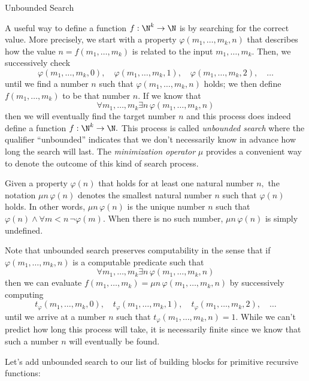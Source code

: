 \begin{unit}{Unbounded Search}

A useful way to define a function \(f:\N^k\to\N\) is by searching for the correct value.
More precisely, we start with a property \(\varphi(m_1,\dots,m_k,n)\) that describes how the value \(n = f(m_1,\dots,m_k)\) is related to the input \(m_1,\dots,m_k.\)
Then, we successively check \[\varphi(m_1,\dots,m_k,0), \quad \varphi(m_1,\dots,m_k,1), \quad \varphi(m_1,\dots,m_k,2), \quad \ldots\] until we find a number \(n\) such that \(\varphi(m_1,\dots,m_k,n)\) holds; we then define \(f(m_1,\dots,m_k)\) to be that number \(n.\)
If we know that \[\forall m_1,\dots,m_k \exists n\,\varphi(m_1,\dots,m_k,n)\] then we will eventually find the target number \(n\) and this process does indeed define a function \(f:\N^k\to\N.\)
This process is called \emph{unbounded search} where the qualifier ``unbounded'' indicates that we don't necessarily know in advance how long the search will last.
The \emph{minimization operator} \(\mu\) provides a convenient way to denote the outcome of this kind of search process.

\begin{definition}\label{D:Minimization}
  Given a property \(\varphi(n)\) that holds for at least one natural number \(n,\) the notation \(\mu n\,\varphi(n)\) denotes the smallest natural number \(n\) such that \(\varphi(n)\) holds.
  In other words, \(\mu n\,\varphi(n)\) is the unique number \(n\) such that \(\varphi(n) \land \forall m < n\,\lnot\varphi(m).\)
  When there is no such number, \(\mu n\,\varphi(n)\) is simply undefined.
\end{definition}

Note that unbounded search preserves computability in the sense that if \(\varphi(m_1,\dots,m_k,n)\) is a computable predicate such that \[\forall m_1,\dots,m_k\exists n\,\varphi(m_1,\dots,m_k,n)\] then we can evaluate \(f(m_1,\dots,m_k) = \mu n\,\varphi(m_1,\dots,m_k,n)\) by successively computing \[t_\varphi(m_1,\dots,m_k,0),\quad t_\varphi(m_1,\dots,m_k,1),\quad t_\varphi(m_1,\dots,m_k,2),\quad\ldots\] until we arrive at a number \(n\) such that \(t_\varphi(m_1,\dots,m_k,n) = 1.\)
While we can't predict how long this process will take, it is necessarily finite since we know that such a number \(n\) will eventually be found.

Let's add unbounded search to our list of building blocks for primitive recursive functions:


\end{unit}
